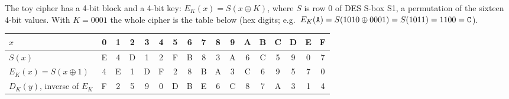 The toy cipher has a 4-bit block and a 4-bit key: $E_K(x) = S(x \oplus K)$, where $S$ is row 0 of DES S-box S1, a permutation of the sixteen 4-bit values. With $K = 0001$ the whole cipher is the table below (hex digits; e.g.\ $E_K(\texttt{A}) = S(1010 \oplus 0001) = S(1011) = 1100 = \texttt{C}$).
\begin{center}\small\setlength{\tabcolsep}{3.4pt}
\begin{tabular}{@{}l*{16}{c}@{}}
\toprule
$x$ & 0&1&2&3&4&5&6&7&8&9&A&B&C&D&E&F\\
\midrule
$S(x)$ & E&4&D&1&2&F&B&8&3&A&6&C&5&9&0&7\\
$E_K(x) = S(x \oplus 1)$ & 4&E&1&D&F&2&8&B&A&3&C&6&9&5&7&0\\
$D_K(y)$, inverse of $E_K$ & F&2&5&9&0&D&B&E&6&C&8&7&A&3&1&4\\
\bottomrule
\end{tabular}
\end{center}

